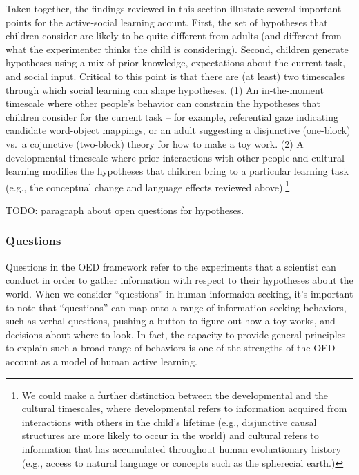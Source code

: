 \documentclass[english,floatsintext,man]{apa6}
\theoremstyle{definition}
\theoremstyle{definition}
\theoremstyle{definition}
\theoremstyle{remark}
\begin{document}
Taken together, the findings reviewed in this section illustate several
important points for the active-social learning acount. First, the set
of hypotheses that children consider are likely to be quite different
from adults (and different from what the experimenter thinks the child
is considering). Second, children generate hypotheses using a mix of
prior knowledge, expectations about the current task, and social input.
Critical to this point is that there are (at least) two timescales
through which social learning can shape hypotheses. (1) An in-the-moment
timescale where other people's behavior can constrain the hypotheses
that children consider for the current task -- for example, referential
gaze indicating candidate word-object mappings, or an adult suggesting a
disjunctive (one-block) vs.~a cojunctive (two-block) theory for how to
make a toy work. (2) A developmental timescale where prior interactions
with other people and cultural learning modifies the hypotheses that
children bring to a particular learning task (e.g., the conceptual
change and language effects reviewed above).\footnote{We could make a
  further distinction between the developmental and the cultural
  timescales, where developmental refers to information acquired from
  interactions with others in the child's lifetime (e.g., disjunctive
  causal structures are more likely to occur in the world) and cultural
  refers to information that has accumulated throughout human
  evoluationary history (e.g., access to natural language or concepts
  such as the spherecial earth.)}

TODO: paragraph about open questions for hypotheses.

\subsubsection{Questions}\label{questions}

Questions in the OED framework refer to the experiments that a scientist
can conduct in order to gather information with respect to their
hypotheses about the world. When we consider \enquote{questions} in
human informaion seeking, it's important to note that
\enquote{questions} can map onto a range of information seeking
behaviors, such as verbal questions, pushing a button to figure out how
a toy works, and decisions about where to look. In fact, the capacity to
provide general principles to explain such a broad range of behaviors is
one of the strengths of the OED account as a model of human active
learning.
\end{document}
